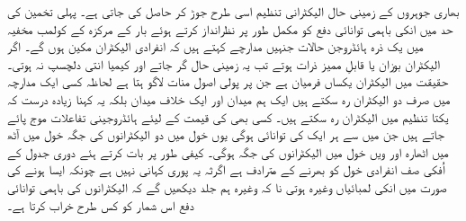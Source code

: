 بھاری جوہروں کے زمینی حال الیکٹرانی تنظیم اسی طرح جوڑ کر حاصل کی جاتی ہے۔ پہلی تخمین کی حد میں انکی باہمی توانائی دفع کو مکمل طور پر نظرانداز کرتے ہوئے بار  کے مرکزہ کے کولمب مخفیہ میں یک ذرہ ہائڈروجن حالات  جنہیں مدارچے کہتے ہیں کہ انفرادی الیکٹران مکین ہوں گے۔ اگر الیکٹران بوزان یا قابلِ ممیز ذرات ہوتے تب یہ زمینی حال  گر جاتے اور کیمیا انتی دلچسپ نہ ہوتی۔ حقیقت میں الیکٹران یکساں فرمیان ہے جن پر پولی اصول منات لاگو ہتا ہے لحاظہ کسی ایک مدارچہ میں صرف دو الیکٹران رہ سکتے ہیں ایک ہم میدان اور ایک خلاف میدان بلکہ یہ کہنا زیادہ درست کہ یکتا تنظیم میں الیکٹران رہ سکتے ہیں۔ کسی بھی  کی قیمت کے لیئے  ہائڈروجینی تفاعلات موج پائے جاتے ہیں جن میں سے ہر ایک کی توانائی  ہوگی یوں  خول میں دو الیکٹرانوں کی جگہ  خول میں آٹھ  میں اٹھارہ اور ویں خول میں  الیکٹرانوں کی جگہ ہوگی۔ کیفی طور پر بات کرتے ہئے دوری جدول کے اُفکی صف انفرادی خول کو بھرنے کے مترادف ہے اگرثہ یہ پوری کہانی نہیں ہے چونکہ ایسا ہونے کی صورت میں انکی لمبائیاں  وغیرہ ہوتی نا کہ  وغیرہ ہم جلد دیکھیں گے کہ الیکٹرانوں کی باہمی توانائی دفع اس شمار کو کس طرح خراب کرتا ہے۔

